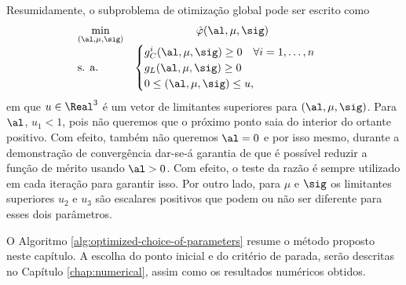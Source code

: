 Resumidamente, o subproblema de otimização global pode ser escrito como
\begin{equation}
	\begin{array}{lc}
\displaystyle \min_{(\al,\mu,\sig)} & \hat\varphi(\al,\mu,\sig) \\
\text{s. a.} &\begin{cases} g_C^i(\al,\mu,\sig) \geq 0 \quad \forall i = 1,\ldots,n \\
				g_L(\al,\mu,\sig)   \geq 0 	\\
				 0\leq (\al,\mu,\sig) \leq u,
				 	
				 \end{cases}\
\end{array}
\label{eq:pop-subproblem}
\end{equation}
em que   $u\in\Real^3$ é um vetor de limitantes superiores para  $(\al,\mu,\sig)$. Para
$\al$, $u_1<1$, pois  não queremos que o próximo ponto saia do interior do ortante positivo. Com efeito, também não queremos $\al=0$ e por isso mesmo,  durante a
demonstração de convergência dar-se-á garantia de que é possível reduzir a
função de mérito usando $\al>0$. Com efeito, o teste da razão é sempre utilizado em cada iteração para garantir isso.
Por outro lado, para $\mu$ e $\sig$ os limitantes superiores $u_{2}$ e $u_{3}$ são escalares positivos que podem ou não ser diferente para esses dois parâmetros.

 
O Algoritmo \ref{alg:optimized-choice-of-parameters} resume o método proposto neste capítulo. A escolha do ponto inicial e do critério de parada, serão descritas no Capítulo \ref{chap:numerical}, assim como os resultados numéricos obtidos.

